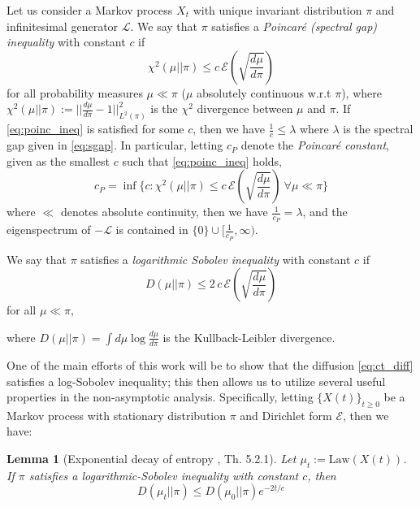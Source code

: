 \documentclass[journal,onecolumn]{IEEEtran}
\newtheorem{lemma}{Lemma}
\newcommand{\KL}{D}
\newcommand{\pconst}{c_P}
\newcommand{\law}{\textrm{Law}}
\newcommand{\gen}{\mathcal{L}}
\newcommand{\dirform}{\mathcal{E}}
\newcommand{\specgap}{\lambda}
\begin{document}
{Let us consider a Markov process $X_t$ with unique invariant distribution $\pi$ and infinitesimal generator $\gen$. We say that $\pi$ satisfies a \textit{Poincar\'e (spectral gap) inequality} with constant $c$ if 
\begin{equation}
\label{eq:poinc_ineq}
    \chi^2(\mu || \pi) \leq c\, \dirform\left(\sqrt{\frac{d\mu}{d\pi}}\right)
\end{equation} for all probability measures $\mu \ll \pi$ ($\mu$ absolutely continuous w.r.t $\pi$),
where \\ $\chi^2(\mu || \pi) := ||\frac{d\mu}{d\pi} - 1||^2_{L^2(\pi)}$ is the $\chi^2$ divergence between $\mu$ and $\pi$. If \eqref{eq:poinc_ineq} is satisfied for some $c$, then we have $\frac{1}{c} \leq \specgap$ where $\specgap$ is the spectral gap given in \eqref{eq:sgap}. In particular, letting $\pconst$ denote the \textit{Poincar\'e constant}, given as the smallest $c$ such that \eqref{eq:poinc_ineq} holds,
\[\pconst = \inf\{c :  \chi^2(\mu || \pi) \leq c\, \dirform\left(\sqrt{\frac{d\mu}{d\pi}}\right) \ \forall \mu \ll \pi\}\]
where $\ll$ denotes absolute continuity, then we have $\frac{1}{\pconst} = \specgap$, and the eigenspectrum of $-\gen$ is contained in $\{0\}\cup[\frac{1}{\pconst},\infty)$.

We say that $\pi$ satisfies a \textit{logarithmic Sobolev inequality} with constant $c$ if \[\KL(\mu || \pi) \leq 2\,c\,\dirform\left(\sqrt{\frac{d\mu}{d\pi}} \right)\] for all $\mu \ll \pi$,

where $\KL(\mu || \pi) = \int d\mu \log \frac{d\mu}{d\pi}$ is the Kullback-Leibler divergence. 

One of the main efforts of this work will be to show that the diffusion \eqref{eq:ct_diff} satisfies a log-Sobolev inequality; this then allows us to utilize several useful properties in the non-asymptotic analysis. Specifically, letting $\{X(t)\}_{t\geq 0}$ be a Markov process with stationary distribution $\pi$ and Dirichlet form $\dirform$, then we have:

\begin{lemma}[Exponential decay of entropy 
\cite{bakry2014analysis}, Th. 5.2.1]
\label{lem:expdecay}
Let $\mu_t := \law(X(t))$. If $\pi$ satisfies a logarithmic-Sobolev inequality with constant $c$, then 
\begin{equation*}
    \KL(\mu_t || \pi) \leq \KL(\mu_0 || \pi)e^{-2t/c}
\end{equation*}
\end{lemma}


}
\end{document}
